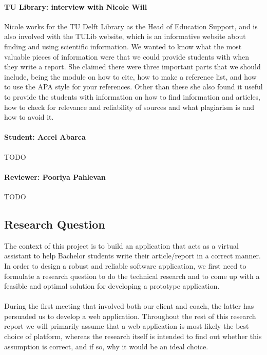 \paragraph{TU Library: interview with Nicole Will}
  Nicole works for the TU Delft Library as the Head of Education Support, and is also involved with the TULib website, which is an informative website about finding and using scientific information.
We wanted to know what the most valuable pieces of information were that we could provide students with when they write a report. She claimed there were three important parts that we should include, being the module on how to cite\cite{tulib:howtocite}, how to make a reference list, and how to use the APA\cite{tulib:apa} style for your references.
Other than these she also found it useful to provide the students with information on how to find information and articles, how to check for relevance and reliability of sources and what plagiarism is and how to avoid it.

\paragraph{Student: Accel Abarca}
TODO
\paragraph{Reviewer: Pooriya Pahlevan}
TODO

\subsection{Research Question}

The context of this project is to build an application that acts as a virtual assistant to help Bachelor students write their article/report in a correct manner. In order to design a robust and reliable software application, we first need to formulate a research question to do the technical research and to come up with a feasible and optimal solution for developing a prototype application.\\\\

During the first meeting that involved both our client and coach, the latter has persuaded us to develop a web application. Throughout the rest of this research report we will primarily assume that a web application is most likely the best choice of platform, whereas the research itself is intended to find out whether this assumption is correct, and if so, why it would be an ideal choice. \\\\

